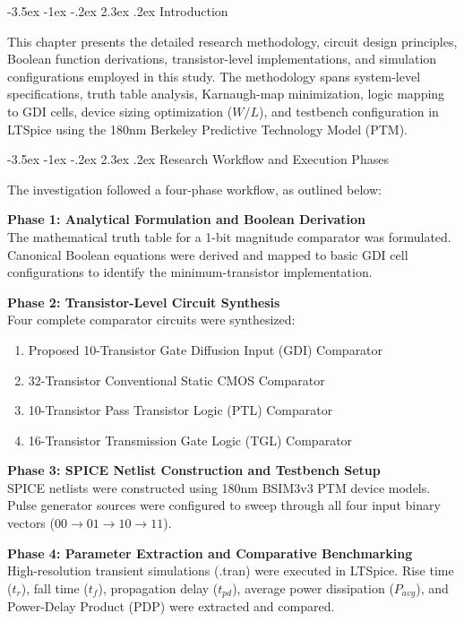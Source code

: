 \documentclass[12pt,a4paper,oneside]{report}
\makeatletter
\renewcommand\section{\@startsection {section}{1}{\z@}%
                                   {-3.5ex \@plus -1ex \@minus -.2ex}%
                                   {2.3ex \@plus.2ex}%
                                   {\normalfont\normalsize\bfseries}}
\makeatother
\begin{document}
\section{Introduction}

This chapter presents the detailed research methodology, circuit design principles, Boolean function derivations, transistor-level implementations, and simulation configurations employed in this study. The methodology spans system-level specifications, truth table analysis, Karnaugh-map minimization, logic mapping to GDI cells, device sizing optimization ($W/L$), and testbench configuration in LTSpice using the 180nm Berkeley Predictive Technology Model (PTM).

\section{Research Workflow and Execution Phases}

The investigation followed a four-phase workflow, as outlined below:

\noindent\textbf{Phase 1: Analytical Formulation and Boolean Derivation}\\
The mathematical truth table for a 1-bit magnitude comparator was formulated. Canonical Boolean equations were derived and mapped to basic GDI cell configurations to identify the minimum-transistor implementation.

\noindent\textbf{Phase 2: Transistor-Level Circuit Synthesis}\\
Four complete comparator circuits were synthesized:
\begin{enumerate}
\item Proposed 10-Transistor Gate Diffusion Input (GDI) Comparator
\item 32-Transistor Conventional Static CMOS Comparator
\item 10-Transistor Pass Transistor Logic (PTL) Comparator
\item 16-Transistor Transmission Gate Logic (TGL) Comparator
\end{enumerate}

\noindent\textbf{Phase 3: SPICE Netlist Construction and Testbench Setup}\\
SPICE netlists were constructed using 180nm BSIM3v3 PTM device models. Pulse generator sources were configured to sweep through all four input binary vectors ($00 \rightarrow 01 \rightarrow 10 \rightarrow 11$).

\noindent\textbf{Phase 4: Parameter Extraction and Comparative Benchmarking}\\
High-resolution transient simulations (.tran) were executed in LTSpice. Rise time ($t_r$), fall time ($t_f$), propagation delay ($t_{pd}$), average power dissipation ($P_{avg}$), and Power-Delay Product (PDP) were extracted and compared.
\end{document}
